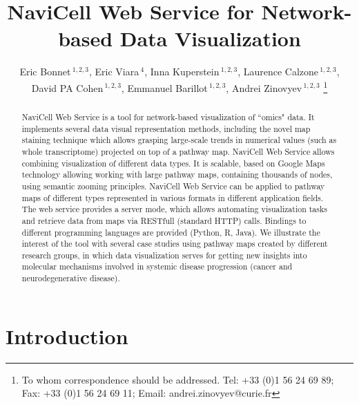 \documentclass[a4,center,fleqn]{NAR}
\begin{document}
\title{NaviCell Web Service for Network-based Data Visualization}


\author{%
Eric Bonnet\,$^{1,2,3}$,
Eric Viara\,$^{4}$,
Inna Kuperstein\,$^{1,2,3}$,
Laurence Calzone\,$^{1,2,3}$,
David PA Cohen\,$^{1,2,3}$,
Emmanuel Barillot\,$^{1,2,3}$,
Andrei Zinovyev\,$^{1,2,3}$%
\footnote{To whom correspondence should be addressed.
Tel: +33 (0)1 56 24 69 89; Fax: +33 (0)1 56 24 69 11; Email: andrei.zinovyev@curie.fr}}

\address{%
$^{1}$Institut Curie, 26 rue d'Ulm, 75248 Paris, France,
$^{2}$INSERM U900, 75248 Paris, France,
$^{3}$Mines ParisTech, 77300 Fontainebleau, France,
$^{4}$Sysra, 91330 Yerres, France.
}




\maketitle

\begin{abstract}
NaviCell Web Service is a tool for network-based visualization of
``omics" data.  It implements several data visual representation methods,
including the novel map staining technique which allows grasping large-scale
trends in numerical values (such as whole transcriptome) projected on top of a
pathway map. NaviCell Web Service allows combining visualization of different data types.
It is scalable, based on Google Maps technology allowing working with large pathway maps,
containing thousands of nodes, using semantic zooming principles.
NaviCell Web Service can be applied to pathway maps of different
types represented in various formats in different application fields.
The web service provides a server mode, which allows automating
visualization tasks and retrieve data from maps via RESTfull (standard HTTP)
calls.  Bindings to different programming languages are provided (Python,
R, Java). We illustrate the interest of the tool  with  several case studies using pathway maps created by different research groups,
in which data visualization serves for getting new insights into molecular mechanisms
involved in systemic disease progression (cancer and neurodegenerative disease).
\end{abstract}


\section{Introduction}
\end{document}
